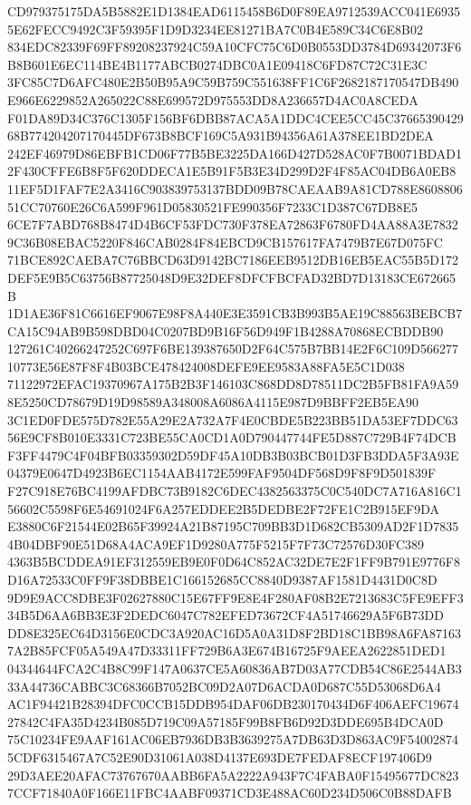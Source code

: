 \documentclass[UTF8,fontset=fandol,zihao=-4,a4paper]{ctexart}
\begin{document}
{{CD979375175DA5B5882E1D1384EAD6115458B6D0F89EA9712539ACC041E69355E62FECC9492C3F59395F1D9D3234EE81271BA7C0B4E589C34C6E8B02
834EDC82339F69FF89208237924C59A10CFC75C6D0B0553DD3784D69342073F6B8B601E6EC114BE4B1177ABCB0274DBC0A1E09418C6FD87C72C31E3C
3FC85C7D6AFC480E2B50B95A9C59B759C551638FF1C6F2682187170547DB490E966E6229852A265022C88E699572D975553DD8A236657D4AC0A8CEDA
F01DA89D34C376C1305F156BF6DBB87ACA5A1DDC4CEE5CC45C3766539042968B774204207170445DF673B8BCF169C5A931B94356A61A378EE1BD2DEA
242EF46979D86EBFB1CD06F77B5BE3225DA166D427D528AC0F7B0071BDAD12F430CFFE6B8F5F620DDECA1E5B91F5B3E34D299D2F4F85AC04DB6A0EB8
11EF5D1FAF7E2A3416C903839753137BDD09B78CAEAAB9A81CD788E860880651CC70760E26C6A599F961D05830521FE990356F7233C1D387C67DB8E5
6CE7F7ABD768B8474D4B6CF53FDC730F378EA72863F6780FD4AA88A3E78329C36B08EBAC5220F846CAB0284F84EBCD9CB157617FA7479B7E67D075FC
71BCE892CAEBA7C76BBCD63D9142BC7186EEB9512DB16EB5EAC55B5D172DEF5E9B5C63756B87725048D9E32DEF8DFCFBCFAD32BD7D13183CE672665B
1D1AE36F81C6616EF9067E98F8A440E3E3591CB3B993B5AE19C88563BEBCB7CA15C94AB9B598DBD04C0207BD9B16F56D949F1B4288A70868ECBDDB90
127261C40266247252C697F6BE139387650D2F64C575B7BB14E2F6C109D56627710773E56E87F8F4B03BCE478424008DEFE9EE9583A88FA5E5C1D038
71122972EFAC19370967A175B2B3F146103C868DD8D78511DC2B5FB81FA9A598E5250CD78679D19D98589A348008A6086A4115E987D9BBFF2EB5EA90
3C1ED0FDE575D782E55A29E2A732A7F4E0CBDE5B223BB51DA53EF7DDC6356E9CF8B010E3331C723BE55CA0CD1A0D790447744FE5D887C729B4F74DCB
F3FF4479C4F04BFB03359302D59DF45A10DB3B03BCB01D3FB3DDA5F3A93E04379E0647D4923B6EC1154AAB4172E599FAF9504DF568D9F8F9D501839F
F27C918E76BC4199AFDBC73B9182C6DEC4382563375C0C540DC7A716A816C156602C5598F6E54691024F6A257EDDEE2B5DEDBE2F72FE1C2B915EF9DA
E3880C6F21544E02B65F39924A21B87195C709BB3D1D682CB5309AD2F1D78354B04DBF90E51D68A4ACA9EF1D9280A775F5215F7F73C72576D30FC389
4363B5BCDDEA91EF312559EB9E0F0D64C852AC32DE7E2F1FF9B791E9776F8D16A72533C0FF9F38DBBE1C166152685CC8840D9387AF1581D4431D0C8D
9D9E9ACC8DBE3F02627880C15E67FF9E8E4F280AF08B2E7213683C5FE9EFF334B5D6AA6BB3E3F2DEDC6047C782EFED73672CF4A51746629A5F6B73DD
DD8E325EC64D3156E0CDC3A920AC16D5A0A31D8F2BD18C1BB98A6FA871637A2B85FCF05A549A47D33311FF729B6A3E674B16725F9AEEA2622851DED1
04344644FCA2C4B8C99F147A0637CE5A60836AB7D03A77CDB54C86E2544AB333A44736CABBC3C68366B7052BC09D2A07D6ACDA0D687C55D53068D6A4
AC1F94421B28394DFC0CCB15DDB954DAF06DB230170434D6F406AEFC1967427842C4FA35D4234B085D719C09A57185F99B8FB6D92D3DDE695B4DCA0D
75C10234FE9AAF161AC06EB7936DB3B3639275A7DB63D3D863AC9F540028745CDF6315467A7C52E90D31061A038D4137E693DE7FEDAF8ECF197406D9
29D3AEE20AFAC73767670AABB6FA5A2222A943F7C4FABA0F15495677DC8237CCF71840A0F166E11FBC4AABF09371CD3E488AC60D234D506C0B88DAFB
}}
\end{document}
